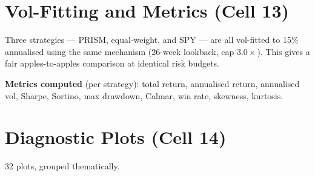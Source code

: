 \documentclass[11pt]{article}
\begin{document}
\section{Vol-Fitting and Metrics (Cell 13)}\label{sec:metrics}

Three strategies --- PRISM, equal-weight, and SPY --- are all vol-fitted to
15\% annualised using the same mechanism (26-week lookback, cap $3.0\times$).
This gives a fair apples-to-apples comparison at identical risk budgets.

\textbf{Metrics computed} (per strategy):
total return, annualised return, annualised vol, Sharpe, Sortino,
max drawdown, Calmar, win rate, skewness, kurtosis.

\section{Diagnostic Plots (Cell 14)}\label{sec:plots}

32 plots, grouped thematically.
\end{document}
